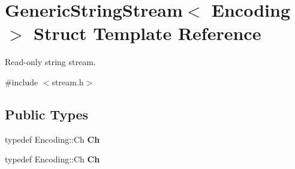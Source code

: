 \hypertarget{struct_generic_string_stream}{}\section{Generic\+String\+Stream$<$ Encoding $>$ Struct Template Reference}
\label{struct_generic_string_stream}


Read-\/only string stream.  




{\ttfamily \#include $<$stream.\+h$>$}

\subsection*{Public Types}
\begin{DoxyCompactItemize}
\item 
typedef Encoding\+::\+Ch {\bfseries Ch}\hypertarget{struct_generic_string_stream_a4289aca895330084ff3168e37e4f08bd}{}\label{struct_generic_string_stream_a4289aca895330084ff3168e37e4f08bd}

\item 
typedef Encoding\+::\+Ch {\bfseries Ch}\hypertarget{struct_generic_string_stream_a4289aca895330084ff3168e37e4f08bd}{}\label{struct_generic_string_stream_a4289aca895330084ff3168e37e4f08bd}

\end{DoxyCompactItemize}
